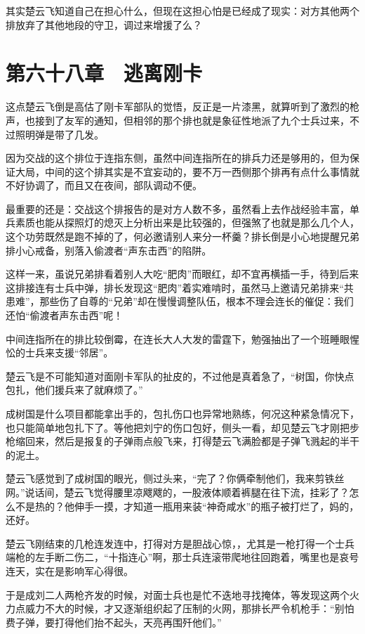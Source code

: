 其实楚云飞知道自己在担心什么，但现在这担心怕是已经成了现实：对方其他两个排放弃了其他地段的守卫，调过来增援了么？

\section{第六十八章　逃离刚卡}

这点楚云飞倒是高估了刚卡军部队的觉悟，反正是一片漆黑，就算听到了激烈的枪声，也接到了友军的通知，但相邻的那个排也就是象征性地派了九个士兵过来，不过照明弹是带了几发。

因为交战的这个排位于连指东侧，虽然中间连指所在的排兵力还是够用的，但为保证大局，中间的这个排其实是不宜妄动的，要不万一西侧那个排再有点什么事情就不好协调了，而且又在夜间，部队调动不便。

最重要的还是：交战这个排报告的是对方人数不多，虽然看上去作战经验丰富，单兵素质也能从探照灯的熄灭上分析出来是比较强的，但强煞了也就是那么几个人，这个功劳既然是跑不掉的了，何必邀请别人来分一杯羹？排长倒是小心地提醒兄弟排小心戒备，别落入偷渡者“声东击西”的陷阱。

这样一来，虽说兄弟排看着别人大吃“肥肉”而眼红，却不宜再横插一手，待到后来这排接连有士兵中弹，排长发现这“肥肉”着实难啃时，虽然马上邀请兄弟排来“共患难”，那些伤了自尊的“兄弟”却在慢慢调整队伍，根本不理会连长的催促：我们还怕“偷渡者声东击西”呢！

中间连指所在的排比较倒霉，在连长大人大发的雷霆下，勉强抽出了一个班睡眼惺忪的士兵来支援“邻居”。

楚云飞是不可能知道对面刚卡军队的扯皮的，不过他是真着急了，“树国，你快点包扎，他们援兵来了就麻烦了。”

成树国是什么项目都能拿出手的，包扎伤口也异常地熟练，何况这种紧急情况下，也只能简单地包扎下了。等他把刘宁的伤口包好，侧头一看，却见楚云飞才刚把步枪缩回来，然后是报复的子弹雨点般飞来，打得楚云飞满脸都是子弹飞溅起的半干的泥土。

楚云飞感觉到了成树国的眼光，侧过头来，“完了？你俩牵制他们，我来剪铁丝网。”说话间，楚云飞觉得腰里凉飕飕的，一股液体顺着裤腿在往下流，挂彩了？怎么不是热的？他伸手一摸，才知道一瓶用来装“神奇咸水”的瓶子被打烂了，妈的，还好。

楚云飞刚结束的几枪连发连中，打得对方是胆战心惊，，尤其是一枪打得一个士兵端枪的左手断二伤二，“十指连心”啊，那士兵连滚带爬地往回跑着，嘴里也是哀号连天，实在是影响军心得很。

于是成刘二人两枪齐发的时候，对面士兵也是忙不迭地寻找掩体，等发现这两个火力点威力不大的时候，才又逐渐组织起了压制的火网，那排长严令机枪手：“别怕费子弹，要打得他们抬不起头，天亮再围歼他们。”

